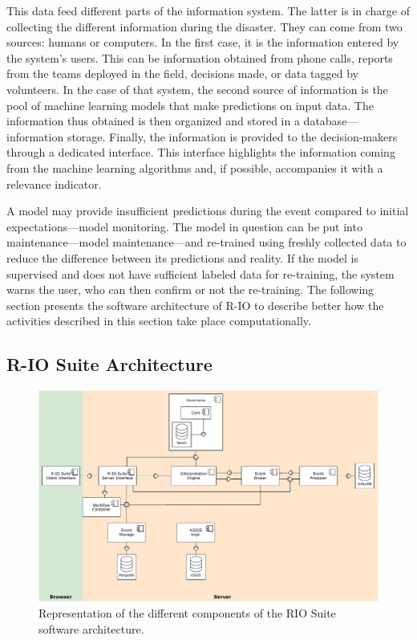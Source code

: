 This data feed different parts of the information system.
The latter is in charge of collecting the different information during the disaster.
They can come from two sources: humans or computers.
In the first case, it is the information entered by the system's users.
This can be information obtained from phone calls, reports from the teams deployed in the field, decisions made, or data tagged by volunteers.
In the case of that system, the second source of information is the pool of machine learning models that make predictions on input data.
The information thus obtained is then organized and stored in a database—information storage.
Finally, the information is provided to the decision-makers through a dedicated interface.
This interface highlights the information coming from the machine learning algorithms and, if possible, accompanies it with a relevance indicator.

A model may provide insufficient predictions during the event compared to initial expectations—model monitoring.
The model in question can be put into maintenance—model maintenance—and re-trained using freshly collected data to reduce the difference between its predictions and reality.
If the model is supervised and does not have sufficient labeled data for re-training, the system warns the user, who can then confirm or not the re-training.
The following section presents the software architecture of R-IO to describe better how the activities described in this section take place computationally.

\subsection{R-IO Suite Architecture}
\begin{figure}[htb]
    \centering
    \includegraphics[width=\textwidth]{figures/chap-5/RIO-archi.pdf}
    \caption{Representation of the different components of the RIO Suite software architecture.}
    \label{system:rio-archi}
\end{figure}


